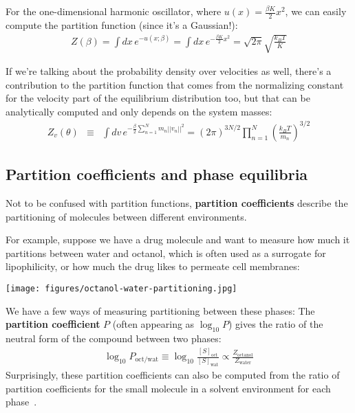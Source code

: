 \documentclass[english,course]{lecture}
\begin{document}
For the one-dimensional harmonic oscillator, where $u(x) = \frac{\beta K}{2} x^2$, we can easily compute the partition function (since it's a Gaussian!):
\begin{eqnarray}
Z(\beta) = \int dx \, e^{-u(x; \beta)} = \int dx \, e^{-\frac{\beta K}{2} x^2} = \sqrt{2 \pi} \sqrt{\frac{k_B T}{K}}
\end{eqnarray}

If we're talking about the probability density over velocities as well, there's a contribution to the partition function that comes from the normalizing constant for the velocity part of the equilibrium distribution too, but that can be analytically computed and only depends on the system masses:
\begin{eqnarray}
Z_v(\theta) &\equiv& \int dv \, e^{-\frac{\beta}{2} \sum_{n=1}^N m_n ||v_n||^2} = (2 \pi)^{3N/2} \prod_{n=1}^N \left(\frac{k_B T}{m_n}\right)^{3/2}
\end{eqnarray}

\subsection{Partition coefficients and phase equilibria}

Not to be confused with partition functions, {\bf partition coefficients} describe the partitioning of molecules between different environments.

For example, suppose we have a drug molecule and want to measure how much it partitions between water and octanol, which is often used as a surrogate for lipophilicity, or how much the drug likes to permeate cell membranes:

\begin{centering}
\texttt{[image: figures/octanol-water-partitioning.jpg]}

\end{centering}

We have a few ways of measuring partitioning between these phases: 
The {\bf partition coefficient} $P$ (often appearing as $\log_{10} P$) gives the ratio of the neutral form of the compound between two phases:
\begin{eqnarray}
\log_{10} P_\mathrm{oct/wat} \equiv \log_{10}\frac{[S]_\mathrm{oct}}{[S]_\mathrm{wat}} \propto \frac{Z_\mathrm{octanol}}{Z_\mathrm{water}}
\end{eqnarray}
Surprisingly, these partition coefficients can also be computed from the ratio of partition coefficients for the small molecule in a solvent environment for each phase~\cite{bannan2016calculating}.
\end{document}
